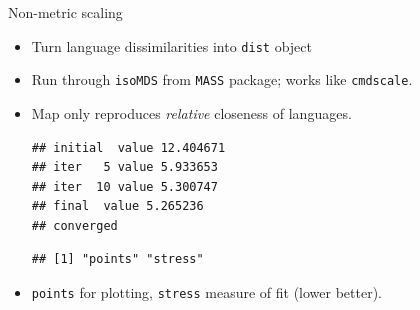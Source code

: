 \begin{frame}[fragile]{Non-metric scaling}
  
  \begin{itemize}
\item Turn language dissimilarities into \texttt{dist} object
\item Run through \texttt{isoMDS} from \texttt{MASS} package; works
  like \texttt{cmdscale}.
\item Map only reproduces {\em relative} closeness of languages.
  
\begin{knitrout}
\color{fgcolor}\begin{kframe}
\begin{alltt}
\hlkwb{=}
\hlkwb{=}
\end{alltt}
\begin{verbatim}
## initial  value 12.404671 
## iter   5 value 5.933653
## iter  10 value 5.300747
## final  value 5.265236 
## converged
\end{verbatim}
\begin{alltt}
\end{alltt}
\begin{verbatim}
## [1] "points" "stress"
\end{verbatim}
\end{kframe}
\end{knitrout}

\item \texttt{points} for plotting, \texttt{stress} measure of fit
  (lower better).

  \end{itemize}

\end{frame}

